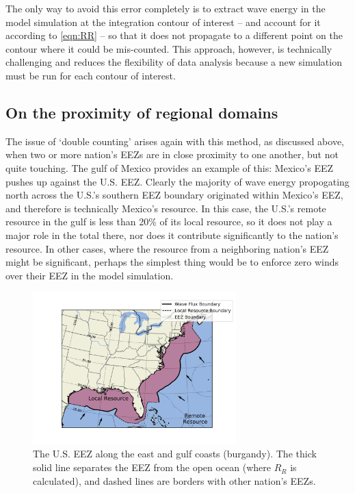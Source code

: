 The only way to avoid this error completely is to extract wave energy in the model simulation at the integration contour of interest -- and account for it according to \eqref{eqn:RR} -- so that it does not propagate to a different point on the contour where it could be mis-counted. This approach, however, is technically challenging and reduces the flexibility of data analysis because a new simulation must be run for each contour of interest.

\subsection{On the proximity of regional domains}

The issue of `double counting' arises again with this method, as discussed above, when two or more nation's EEZs are in close proximity to one another, but not quite touching. The gulf of Mexico provides an example of this: Mexico's EEZ pushes up against the U.S. EEZ. Clearly the majority of wave energy propogating north across the U.S.'s southern EEZ boundary originated within Mexico's EEZ, and therefore is technically Mexico's resource. In this case, the U.S.'s remote resource in the gulf is less than 20\% of its local resource, so it does not play a major role in the total there, nor does it contribute significantly to the nation's resource. In other cases, where the resource from a neighboring nation's EEZ might be significant, perhaps the simplest thing would be to enforce zero winds over their EEZ in the model simulation.

\begin{figure}
    \centering
    \includegraphics[width=0.7\textwidth]{../fig/at_EEZ_resourcePlot}
    \caption{The U.S. EEZ along the east and gulf coasts (burgandy). The thick solid line separates the EEZ from the open ocean (where $R_R$ is calculated), and dashed lines are borders with other nation's EEZs.}
    \label{fig:at-EEZ}
\end{figure}


